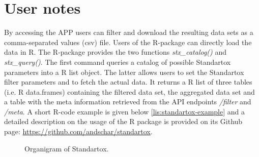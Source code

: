 \section{User notes}
By accessing the APP users can filter and download the resulting data sets as a comma-separated values (csv) file. Users of the R-package can directly load the data in R. The R-package provides the two functions \textit{stx\_catalog()} and \textit{stx\_query()}. The first command queries a catalog of possible Standartox parameters into a R list object. The latter allows users to set the Standartox filter parameters and to fetch the actual data. It returns a R list of three tables (i.e. R data.frames) containing the filtered data set, the aggregated data set and a table with the meta information retrieved from the API endpoints \textit{/filter} and \textit{/meta}. A short R-code example is given below \ref{lis:standartox-example} and a detailed description on the usage of the R package is provided on its Github page: \url{https://github.com/andschar/standartox}.



\begin{figure}[h]
    
    \caption{Organigram of Standartox.}
    \label{fig:stx-organigram}
\end{figure}


